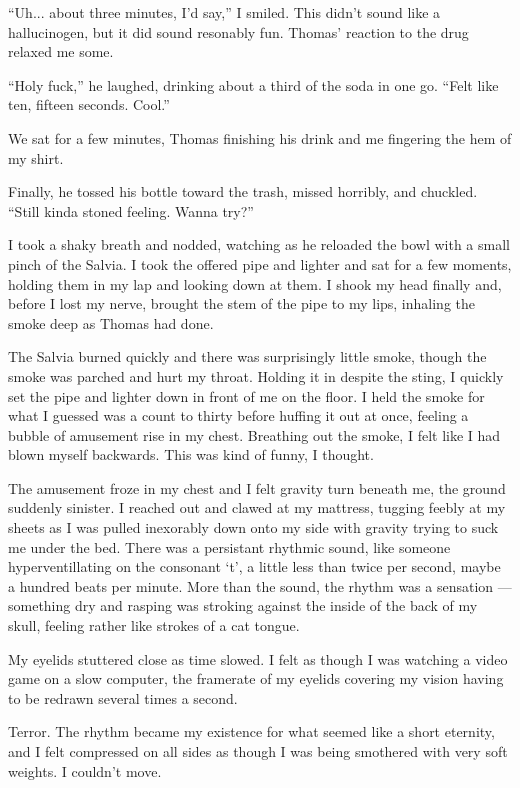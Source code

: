 ``Uh... about three minutes, I'd say,'' I smiled.  This didn't sound like a hallucinogen, but it did sound resonably fun.  Thomas' reaction to the drug relaxed me some.

``Holy fuck,'' he laughed, drinking about a third of the soda in one go.  ``Felt like ten, fifteen seconds.  Cool.''

We sat for a few minutes, Thomas finishing his drink and me fingering the hem of my shirt.

Finally, he tossed his bottle toward the trash, missed horribly, and chuckled.  ``Still kinda stoned feeling.  Wanna try?''

I took a shaky breath and nodded, watching as he reloaded the bowl with a small pinch of the Salvia.  I took the offered pipe and lighter and sat for a few moments, holding them in my lap and looking down at them.  I shook my head finally and, before I lost my nerve, brought the stem of the pipe to my lips, inhaling the smoke deep as Thomas had done.

The Salvia burned quickly and there was surprisingly little smoke, though the smoke was parched and hurt my throat.  Holding it in despite the sting, I quickly set the pipe and lighter down in front of me on the floor.  I held the smoke for what I guessed was a count to thirty before huffing it out at once, feeling a bubble of amusement rise in my chest.  Breathing out the smoke, I felt like I had blown myself backwards.  This was kind of funny, I thought.

The amusement froze in my chest and I felt gravity turn beneath me, the ground suddenly sinister.  I reached out and clawed at my mattress, tugging feebly at my sheets as I was pulled inexorably down onto my side with gravity trying to suck me under the bed.  There was a persistant rhythmic sound, like someone hyperventillating on the consonant `t', a little less than twice per second, maybe a hundred beats per minute.  More than the sound, the rhythm was a sensation --- something dry and rasping was stroking against the inside of the back of my skull, feeling rather like strokes of a cat tongue.

My eyelids stuttered close as time slowed.  I felt as though I was watching a video game on a slow computer, the framerate of my eyelids covering my vision having to be redrawn several times a second.

Terror.  The rhythm became my existence for what seemed like a short eternity, and I felt compressed on all sides as though I was being smothered with very soft weights.  I couldn't move.

